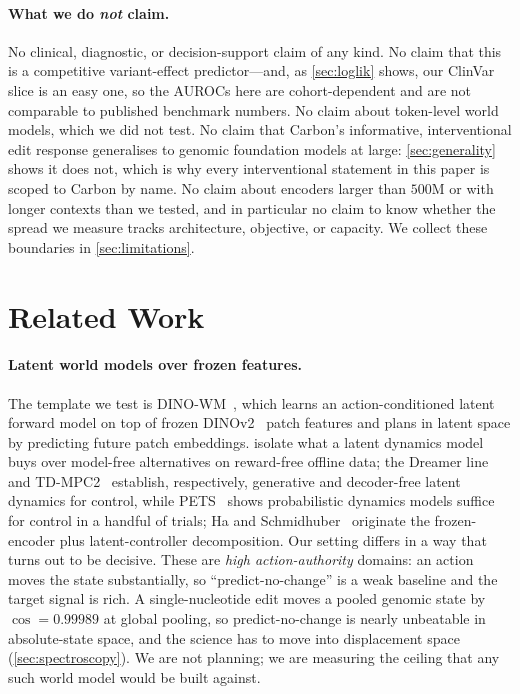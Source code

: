 \documentclass{article}
\begin{document}
\paragraph{What we do \emph{not} claim.} No clinical, diagnostic, or decision-support claim of any
kind. No claim that this is a competitive variant-effect predictor---and, as \cref{sec:loglik}
shows, our ClinVar slice is an easy one, so the AUROCs here are cohort-dependent and are not
comparable to published benchmark numbers. No claim about token-level world models, which we did not
test. No claim that Carbon's informative, interventional edit response generalises to genomic
foundation models at large: \cref{sec:generality} shows it does not, which is why every
interventional statement in this paper is scoped to Carbon by name. No claim about encoders larger
than $500$M or with longer contexts than we tested, and in particular no claim to know whether the
spread we measure tracks architecture, objective, or capacity. We collect these boundaries in
\cref{sec:limitations}.

\figArchitecture

\section{Related Work}
\label{sec:related}

\paragraph{Latent world models over frozen features.}
The template we test is DINO-WM~\citep{dinowm2025}, which learns an action-conditioned latent
forward model on top of frozen DINOv2~\citep{dinov2_2024} patch features and plans in latent space
by predicting future patch embeddings. \citet{sobal2025rewardfree} isolate what a latent dynamics
model buys over model-free alternatives on reward-free offline data; the Dreamer
line~\citep{dreamerv3} and TD-MPC2~\citep{tdmpc2_2024} establish, respectively, generative and
decoder-free latent dynamics for control, while PETS~\citep{pets2018} shows probabilistic dynamics
models suffice for control in a handful of trials; Ha and Schmidhuber~\citep{worldmodels2018} originate the
frozen-encoder plus latent-controller decomposition. Our setting differs in a way that turns out to
be decisive. These are \emph{high action-authority} domains: an action moves the state
substantially, so ``predict-no-change'' is a weak baseline and the target signal is rich. A
single-nucleotide edit moves a pooled genomic state by $\cos=0.99989$ at global pooling, so
predict-no-change is nearly unbeatable in absolute-state space, and the science has to move into
displacement space (\cref{sec:spectroscopy}). We are not planning; we are measuring the ceiling
that any such world model would be built against.
\end{document}
